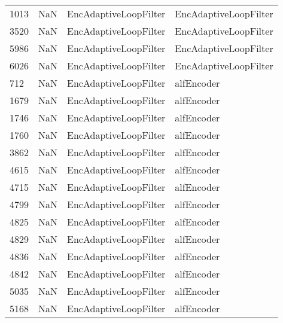 \begin{tabular}{llll}
1013 &                   NaN &      EncAdaptiveLoopFilter &                     EncAdaptiveLoopFilter \\
3520 &                   NaN &      EncAdaptiveLoopFilter &                     EncAdaptiveLoopFilter \\
5986 &                   NaN &      EncAdaptiveLoopFilter &                     EncAdaptiveLoopFilter \\
6026 &                   NaN &      EncAdaptiveLoopFilter &                     EncAdaptiveLoopFilter \\
712  &                   NaN &      EncAdaptiveLoopFilter &                                alfEncoder \\
1679 &                   NaN &      EncAdaptiveLoopFilter &                                alfEncoder \\
1746 &                   NaN &      EncAdaptiveLoopFilter &                                alfEncoder \\
1760 &                   NaN &      EncAdaptiveLoopFilter &                                alfEncoder \\
3862 &                   NaN &      EncAdaptiveLoopFilter &                                alfEncoder \\
4615 &                   NaN &      EncAdaptiveLoopFilter &                                alfEncoder \\
4715 &                   NaN &      EncAdaptiveLoopFilter &                                alfEncoder \\
4799 &                   NaN &      EncAdaptiveLoopFilter &                                alfEncoder \\
4825 &                   NaN &      EncAdaptiveLoopFilter &                                alfEncoder \\
4829 &                   NaN &      EncAdaptiveLoopFilter &                                alfEncoder \\
4836 &                   NaN &      EncAdaptiveLoopFilter &                                alfEncoder \\
4842 &                   NaN &      EncAdaptiveLoopFilter &                                alfEncoder \\
5035 &                   NaN &      EncAdaptiveLoopFilter &                                alfEncoder \\
5168 &                   NaN &      EncAdaptiveLoopFilter &                                alfEncoder \\

\end{tabular}
